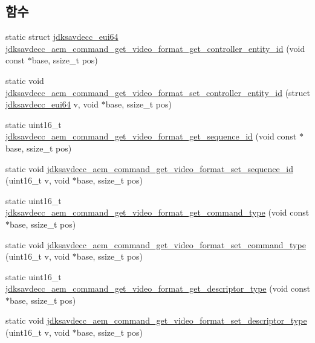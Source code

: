 \subsection*{함수}
\begin{DoxyCompactItemize}
\item 
static struct \hyperlink{structjdksavdecc__eui64}{jdksavdecc\+\_\+eui64} \hyperlink{group__command__get__video__format_gaaae4a77c345d3c008014a3e2172ec886}{jdksavdecc\+\_\+aem\+\_\+command\+\_\+get\+\_\+video\+\_\+format\+\_\+get\+\_\+controller\+\_\+entity\+\_\+id} (void const $\ast$base, ssize\+\_\+t pos)
\item 
static void \hyperlink{group__command__get__video__format_ga87808ece65d483ee0989d05326be8df8}{jdksavdecc\+\_\+aem\+\_\+command\+\_\+get\+\_\+video\+\_\+format\+\_\+set\+\_\+controller\+\_\+entity\+\_\+id} (struct \hyperlink{structjdksavdecc__eui64}{jdksavdecc\+\_\+eui64} v, void $\ast$base, ssize\+\_\+t pos)
\item 
static uint16\+\_\+t \hyperlink{group__command__get__video__format_ga6ad53eda7dee7756499ae24946c7f1b2}{jdksavdecc\+\_\+aem\+\_\+command\+\_\+get\+\_\+video\+\_\+format\+\_\+get\+\_\+sequence\+\_\+id} (void const $\ast$base, ssize\+\_\+t pos)
\item 
static void \hyperlink{group__command__get__video__format_gafb56630cda469c476dbcaedf0feceebb}{jdksavdecc\+\_\+aem\+\_\+command\+\_\+get\+\_\+video\+\_\+format\+\_\+set\+\_\+sequence\+\_\+id} (uint16\+\_\+t v, void $\ast$base, ssize\+\_\+t pos)
\item 
static uint16\+\_\+t \hyperlink{group__command__get__video__format_ga23088631de6b659db5bd426f6d5617ab}{jdksavdecc\+\_\+aem\+\_\+command\+\_\+get\+\_\+video\+\_\+format\+\_\+get\+\_\+command\+\_\+type} (void const $\ast$base, ssize\+\_\+t pos)
\item 
static void \hyperlink{group__command__get__video__format_ga4b8a1f8b423af86750b68125a8297ed8}{jdksavdecc\+\_\+aem\+\_\+command\+\_\+get\+\_\+video\+\_\+format\+\_\+set\+\_\+command\+\_\+type} (uint16\+\_\+t v, void $\ast$base, ssize\+\_\+t pos)
\item 
static uint16\+\_\+t \hyperlink{group__command__get__video__format_ga2350a93470391c8bd8d27b204befe72f}{jdksavdecc\+\_\+aem\+\_\+command\+\_\+get\+\_\+video\+\_\+format\+\_\+get\+\_\+descriptor\+\_\+type} (void const $\ast$base, ssize\+\_\+t pos)
\item 
static void \hyperlink{group__command__get__video__format_gaf8f4de958a90bc2347ea541ffe7e2508}{jdksavdecc\+\_\+aem\+\_\+command\+\_\+get\+\_\+video\+\_\+format\+\_\+set\+\_\+descriptor\+\_\+type} (uint16\+\_\+t v, void $\ast$base, ssize\+\_\+t pos)

\end{DoxyCompactItemize}
